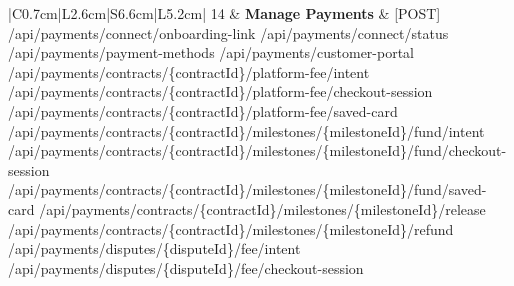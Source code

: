 \begin{longtable}{|C{0.7cm}|L{2.6cm}|S{6.6cm}|L{5.2cm}|}
14
&
\textbf{Manage Payments}
&
[POST] /\allowbreak{}api/\allowbreak{}payments/\allowbreak{}connect/\allowbreak{}onboarding-link \newline
[GET] /\allowbreak{}api/\allowbreak{}payments/\allowbreak{}connect/\allowbreak{}status \newline
[GET] /\allowbreak{}api/\allowbreak{}payments/\allowbreak{}payment-methods \newline
[POST] /\allowbreak{}api/\allowbreak{}payments/\allowbreak{}customer-portal \newline
[POST] /\allowbreak{}api/\allowbreak{}payments/\allowbreak{}contracts/\allowbreak{}\{contractId\}/\allowbreak{}platform-fee/\allowbreak{}intent \newline
[POST] /\allowbreak{}api/\allowbreak{}payments/\allowbreak{}contracts/\allowbreak{}\{contractId\}/\allowbreak{}platform-fee/\allowbreak{}checkout-session \newline
[POST] /\allowbreak{}api/\allowbreak{}payments/\allowbreak{}contracts/\allowbreak{}\{contractId\}/\allowbreak{}platform-fee/\allowbreak{}saved-card \newline
[POST] /\allowbreak{}api/\allowbreak{}payments/\allowbreak{}contracts/\allowbreak{}\{contractId\}/\allowbreak{}milestones/\allowbreak{}\{milestoneId\}/\allowbreak{}fund/\allowbreak{}intent \newline
[POST] /\allowbreak{}api/\allowbreak{}payments/\allowbreak{}contracts/\allowbreak{}\{contractId\}/\allowbreak{}milestones/\allowbreak{}\{milestoneId\}/\allowbreak{}fund/\allowbreak{}checkout-session \newline
[POST] /\allowbreak{}api/\allowbreak{}payments/\allowbreak{}contracts/\allowbreak{}\{contractId\}/\allowbreak{}milestones/\allowbreak{}\{milestoneId\}/\allowbreak{}fund/\allowbreak{}saved-card \newline
[POST] /\allowbreak{}api/\allowbreak{}payments/\allowbreak{}contracts/\allowbreak{}\{contractId\}/\allowbreak{}milestones/\allowbreak{}\{milestoneId\}/\allowbreak{}release \newline
[POST] /\allowbreak{}api/\allowbreak{}payments/\allowbreak{}contracts/\allowbreak{}\{contractId\}/\allowbreak{}milestones/\allowbreak{}\{milestoneId\}/\allowbreak{}refund \newline
[POST] /\allowbreak{}api/\allowbreak{}payments/\allowbreak{}disputes/\allowbreak{}\{disputeId\}/\allowbreak{}fee/\allowbreak{}intent \newline
[POST] /\allowbreak{}api/\allowbreak{}payments/\allowbreak{}disputes/\allowbreak{}\{disputeId\}/\allowbreak{}fee/\allowbreak{}checkout-session \newline

\end{longtable}
